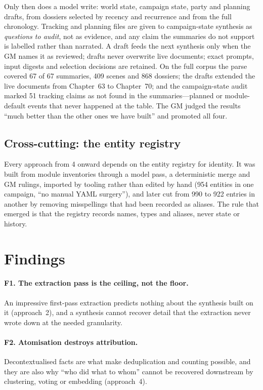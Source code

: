 \documentclass[11pt]{article}
\begin{document}
Only then does a model write: world state, campaign state, party and planning drafts, from dossiers
selected by recency and recurrence and from the full chronology. Tracking and planning files are given
to campaign-state synthesis as \emph{questions to audit}, not as evidence, and any claim the summaries
do not support is labelled rather than narrated. A draft feeds the next synthesis only when the GM names
it as reviewed; drafts never overwrite live documents; exact prompts, input digests and selection
decisions are retained. On the full corpus the parse covered 67 of 67 summaries, 409 scenes and 868
dossiers; the drafts extended the live documents from Chapter~63 to Chapter~70; and the campaign-state
audit marked 51 tracking claims as not found in the summaries---planned or module-default events that
never happened at the table. The GM judged the results ``much better than the other ones we have
built'' and promoted all four.

\subsection{Cross-cutting: the entity registry}
Every approach from 4 onward depends on the entity registry for identity. It was built from module
inventories through a model pass, a deterministic merge and GM rulings, imported by tooling rather than
edited by hand (954 entities in one campaign, ``no manual YAML surgery''), and later cut from 990 to 922
entries in another by removing misspellings that had been recorded as aliases. The rule that emerged is
that the registry records names, types and aliases, never state or history.

\section{Findings}
\label{sec:findings}

\paragraph{F1. The extraction pass is the ceiling, not the floor.}
An impressive first-pass extraction predicts nothing about the synthesis built on it (approach~2), and
a synthesis cannot recover detail that the extraction never wrote down at the needed granularity.

\paragraph{F2. Atomisation destroys attribution.}
Decontextualised facts are what make deduplication and counting possible, and they are also why ``who
did what to whom'' cannot be recovered downstream by clustering, voting or embedding (approach~4).
\end{document}
